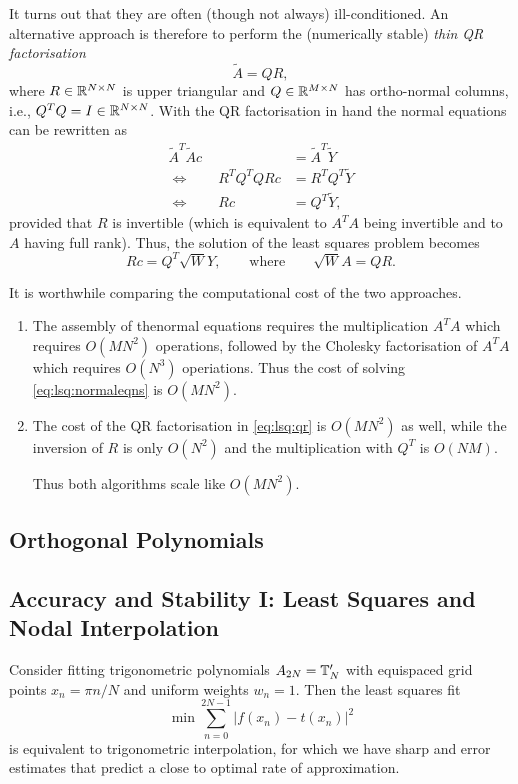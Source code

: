 It turns out that they are often (though not always) ill-conditioned. 
An alternative approach is therefore to perform the (numerically stable)
{\em thin QR factorisation}
\[
    \tilde{A} = Q R,   
\]
where $R \in \mathbb{R}^{N \times N}$ is upper triangular and  $Q \in \mathbb{R}^{M \times N}$
has ortho-normal columns, i.e., $Q^T Q = I \in \mathbb{R}^{N \times N}$. 
With the QR factorisation in hand the normal equations can be rewritten as 
\begin{align*}
    \tilde{A}^T\tilde{A} c &= \tilde{A}^T \tilde{Y} \\ 
    \Leftrightarrow \qquad 
    R^T Q^T Q R c &= R^T Q^T \tilde{Y} \\ 
    \Leftrightarrow \qquad 
    R c &= Q^T \tilde{Y},
\end{align*}
provided that $R$ is invertible (which is equivalent to $A^T A$ being invertible 
and to $A$ having full rank). Thus, the solution of the least squares problem 
becomes 
\begin{equation}
    \label{eq:lsq:qr}
    R c = Q^T \sqrt{W} Y, \qquad \text{where} \qquad 
    \sqrt{W} A = QR.
\end{equation}

It is worthwhile comparing the computational cost of the two approaches. 
\begin{enumerate}
\item The assembly of thenormal equations requires the multiplication 
$A^T A$ which requires $O(M N^2)$ operations, followed by  the 
Cholesky factorisation of $A^T A$ which requires $O(N^3)$ operiations. 
Thus the cost of solving \eqref{eq:lsq:normaleqns} is $O(M N^2)$. 
\item The cost of the QR factorisation in \eqref{eq:lsq:qr} is 
$O(M N^2)$ as well, while the inversion of $R$ is only $O(N^2)$ and the 
multiplication with $Q^T$ is $O(NM)$. 

Thus both algorithms scale like $O(M N^2)$.
\end{enumerate}


\subsection{Orthogonal Polynomials}
%
\label{sec:lsq:orthpolys}
%


\subsection{Accuracy and Stability I: Least Squares and Nodal Interpolation}
%
Consider fitting trigonometric polynomials $A_{2N} = \mathbb{T}_N'$ with equispaced
grid points $x_n = \pi n / N$ and uniform weights $w_n = 1$. Then the
least squares fit 
\[
    \min \sum_{n = 0}^{2N-1} |f(x_n) - t(x_n)|^2 
\]
is equivalent to trigonometric interpolation, for which we have sharp and error
estimates that predict a close to optimal rate of approximation. 


